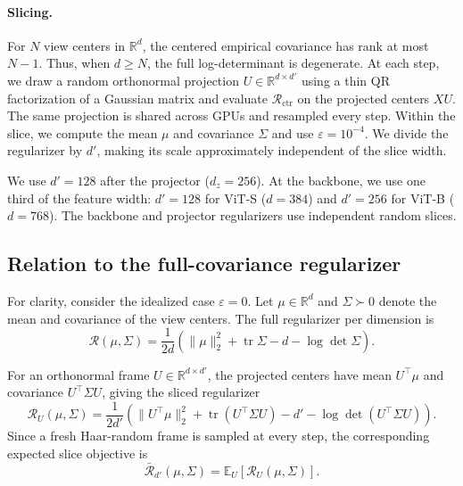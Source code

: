 \documentclass{article} %
\theoremstyle{remark}
\begin{document}
\paragraph{Slicing.}
For $N$ view centers in $\mathbb R^d$, the centered empirical covariance has rank at most $N-1$.
Thus, when $d\geq N$, the full log-determinant is degenerate.
At each step, we draw a random orthonormal projection
$U\in\mathbb R^{d\times d'}$ using a thin QR factorization of a Gaussian matrix and evaluate
$\mathcal R_{\mathrm{ctr}}$ on the projected centers $XU$.
The same projection is shared across GPUs and resampled every step.
Within the slice, we compute the mean $\mu$ and covariance $\Sigma$ and use $\varepsilon=10^{-4}$.
We divide the regularizer by $d'$, making its scale approximately independent of the slice width.

We use $d'=128$ after the projector ($d_z=256$).
At the backbone, we use one third of the feature width:
$d'=128$ for ViT-S ($d=384$) and $d'=256$ for ViT-B ($d=768$).
The backbone and projector regularizers use independent random slices.

\subsection{Relation to the full-covariance regularizer}
\label{app:slicing-theory}

For clarity, consider the idealized case $\varepsilon=0$.
Let $\mu\in\mathbb R^d$ and $\Sigma\succ0$ denote the mean and covariance
of the view centers. The full regularizer per dimension is
\[
\mathcal R(\mu,\Sigma)
=
\frac{1}{2d}
\left(
\|\mu\|_2^2+\operatorname{tr}\Sigma-d-\log\det\Sigma
\right).
\]

For an orthonormal frame $U\in\mathbb R^{d\times d'}$, the projected
centers have mean $U^\top\mu$ and covariance $U^\top\Sigma U$, giving
the sliced regularizer
\[
\mathcal R_U(\mu,\Sigma)
=
\frac{1}{2d'}
\left(
\|U^\top\mu\|_2^2
+\operatorname{tr}(U^\top\Sigma U)
-d'
-\log\det(U^\top\Sigma U)
\right).
\]
Since a fresh Haar-random frame is sampled at every step, the
corresponding expected slice objective is
\[
\bar{\mathcal R}_{d'}(\mu,\Sigma)
=
\mathbb E_U[\mathcal R_U(\mu,\Sigma)].
\]
\end{document}
